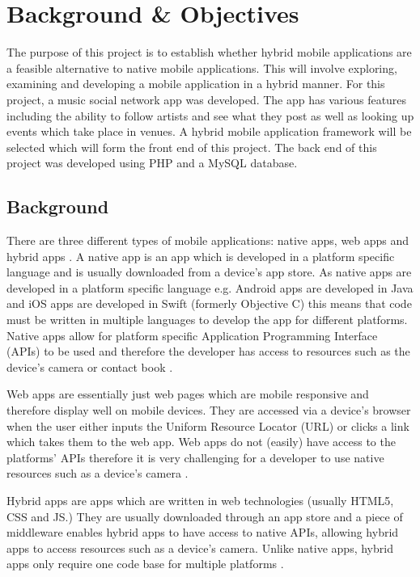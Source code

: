 \chapter{Background \& Objectives}

The purpose of this project is to establish whether hybrid mobile applications are a feasible alternative to native mobile applications. This will involve exploring, examining and developing a mobile application in a hybrid manner. For this project, a music social network app was developed. The app has various features including the ability to follow artists and see what they post as well as looking up events which take place in venues. A hybrid mobile application framework will be selected which will form the front end of this project. The back end of this project was developed using PHP and a MySQL database.

\section{Background}
There are three different types of mobile applications: native apps, web apps and  hybrid apps \cite{IIA} \cite{BAB} \cite{PTA}. A native app is an app which is developed in a platform specific language and is usually downloaded from a device's app store. As native apps are developed in a platform specific language e.g. Android apps are developed in Java \cite{AD} and iOS apps are developed in Swift (formerly Objective C) \cite{ID} this means that code must be written in multiple languages to develop the app for different platforms. Native apps allow for platform specific Application Programming Interface (APIs) to be used and therefore the developer has access to resources such as the device's camera or contact book \cite{drupal} \cite{MAC} .

Web apps are essentially just web pages which are mobile responsive and therefore display well on mobile devices. They are accessed via a device's browser when the user either inputs the Uniform Resource Locator (URL) or clicks a link which takes them to the web app. Web apps do not (easily) have access to the platforms' APIs therefore it is very challenging for a developer to use native resources such as a device's camera \cite{BAB} \cite{MAC}.

Hybrid apps are apps which are written in web technologies (usually HTML5, CSS and JS.) They are usually downloaded through an app store and a piece of middleware enables hybrid apps to have access to native APIs, allowing hybrid apps to access resources such as a device's camera. Unlike native apps, hybrid apps only require one code base for multiple platforms\cite{SF} \cite{MAC}.

